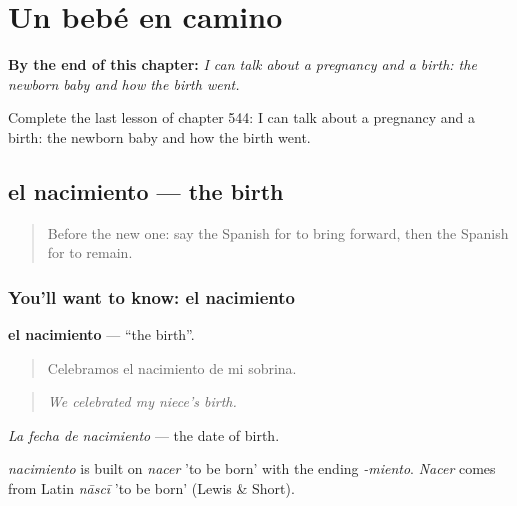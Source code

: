 
\chapter{Un bebé en camino}
\label{ch:es-un-bebe-en-camino}

\begin{chapteropening}
\textbf{By the end of this chapter:} \emph{I can talk about a pregnancy and a birth: the newborn baby and how the birth went.}

Complete the last lesson of chapter 544: I can talk about a pregnancy and a birth: the newborn baby and how the birth went.
\end{chapteropening}

\section[el nacimiento]{el nacimiento — the birth}

\label{lesson:ES-C544-nacimiento}



\begin{quote}
Before the new one: say the Spanish for to bring forward, then the Spanish for to remain.
\end{quote}

\subsection*{You'll want to know: el nacimiento}
\textbf{el nacimiento} — \textquotedblleft{}the birth\textquotedblright{}.

\begin{quote}
Celebramos el nacimiento de mi sobrina.
\end{quote}

\begin{quote}
\emph{We celebrated my niece's birth.}
\end{quote}

\emph{La fecha de nacimiento} — the date of birth.

\begin{cousinweb}
\emph{nacimiento} is built on \emph{nacer} 'to be born' with the ending \emph{-miento}. \emph{Nacer} comes from Latin \emph{nāscī} 'to be born' (Lewis \& Short).
\end{cousinweb}

